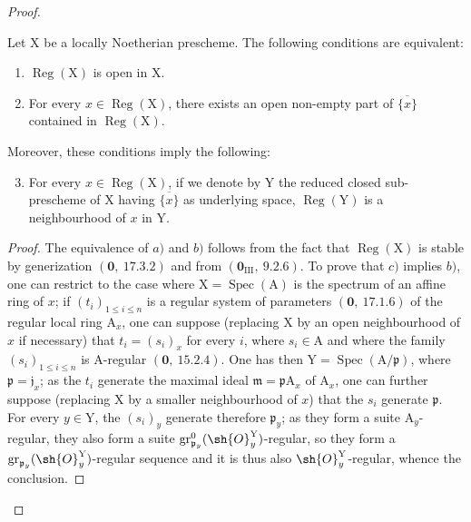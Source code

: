 \begin{proof}
\begin{proposition}[6.12.2]
\label{IV.6.12.2}
Let $\mathrm{X}$ be a locally Noetherian prescheme. The following conditions
are equivalent:
\begin{enumerate}[label=\emph{\alph*)}]
  \item $\operatorname{Reg}(\mathrm{X})$ is open in $\mathrm{X}$.
  \item For every $x\in\operatorname{Reg}(\mathrm{X})$, there exists an open non-empty part of $\overline{\{x\}}$ contained in $\operatorname{Reg}(\mathrm{X})$.
\end{enumerate}
Moreover, these conditions imply the following:
\begin{enumerate}[label=\emph{\alph*)}]
\setcounter{enumi}{2}
  \item For every $x\in\operatorname{Reg}(\mathrm{X})$, if we denote by $\mathrm{Y}$ the reduced closed sub-prescheme of $\mathrm{X}$ having $\overline{\{x\}}$
as underlying space, $\operatorname{Reg}(\mathrm{Y})$ is a neighbourhood of $x$ in $\mathrm{Y}$.
\end{enumerate}
\end{proposition}

\begin{proof}
The equivalence of $a)$ and $b)$ follows from the fact that $\operatorname{Reg}(\mathrm{X})$ is stable by generization
$(\mathbf{0},~17.3.2)$ and from $(\mathbf{0}_{\mathrm{III}},~9.2.6)$. To prove that $c)$ implies $b)$, one can restrict to the
case where $\mathrm{X}=\operatorname{Spec}(\mathrm{A})$ is the spectrum of an affine ring of $x$; if $(t_i)_{1\leqslant i\leqslant n}$ is a regular
system of parameters $(\mathbf{0},~17.1.6)$ of the regular local ring $\mathrm{A}_x$, one can suppose
(replacing $\mathrm{X}$ by an open neighbourhood of $x$ if necessary) that $t_i=(s_i)_x$ for every $i$,
where $s_i\in\mathrm{A}$ and where the family $(s_i)_{1\leqslant i\leqslant n}$ is $\mathrm{A}$-regular $(\mathbf{0},~15.2.4)$. One has then $\mathrm{Y}=\operatorname{Spec}(\mathrm{A}/\mathfrak{p})$,
where $\mathfrak{p}=\mathfrak{j}_x$; as the $t_i$ generate the maximal ideal $\mathfrak{m}=\mathfrak{p}\mathrm{A}_x$ of $\mathrm{A}_x$, one can further
suppose (replacing $\mathrm{X}$ by a smaller neighbourhood of $x$) that the $s_i$ generate $\mathfrak{p}$.
For every $y\in\mathrm{Y}$, the $(s_i)_y$ generate therefore $\mathfrak{p}_y$; as they form a suite $\mathrm{A}_y$-regular,
they also form a suite $\operatorname{gr}^0_{\mathfrak{p}_y}(\sh{O}^{\mathrm{Y}}_y)$-regular, so they form a
$\operatorname{gr}_{\mathfrak{p}_y}(\sh{O}^{\mathrm{Y}}_y)$-regular sequence and it is thus also $\sh{O}^{\mathrm{Y}}_y$-regular,
whence the conclusion.
\end{proof}


\end{proof}
